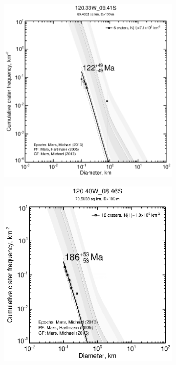 \documentclass[12pt,letter]{article}
\begin{document}
\begin{figure}[h]
\begin{subfigure}{.33\textwidth}
\end{subfigure}%
\begin{subfigure}{.33\textwidth}
  \includegraphics[width=\linewidth,clip,trim=1cm 1cm 1.5cm 1cm]{figures/craterstats/120-33W_09-41S_100m_cum.eps}
\end{subfigure}
\begin{subfigure}{.33\textwidth}
  \includegraphics[width=\linewidth,clip,trim=1cm 1cm 1.5cm 1cm]{figures/craterstats/120-40W_08-46S_100m_cum.eps}

\end{subfigure}
\end{figure}
\end{document}

